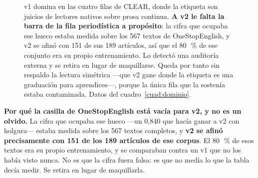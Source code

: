 \documentclass[11pt,a4paper]{article}
\newcommand{\cod}[1]{\texttt{\small #1}}
\newcommand{\pct}{\,\%}
\begin{document}
\begin{figure}[htbp]
\centering
{}
\caption[Matriz modelo $\times$ dominio]{v1 domina en las cuatro filas de CLEAR, donde la
etiqueta son juicios de lectores nativos sobre prosa continua. \textbf{A v2 le falta la
barra de la fila periodística a propósito}: la cifra que ocupaba ese hueco estaba medida
sobre los 567 textos de OneStopEnglish, y v2 se afinó con 151 de sus 189 artículos, así
que el 80~\pct{} de ese conjunto era su propio entrenamiento. Lo detectó una auditoría
externa y se retira en lugar de maquillarse. Queda por tanto sin respaldo la lectura
simétrica —que v2 gane donde la etiqueta es una graduación para aprendices—, porque la
única fila que la sostenía estaba contaminada. Datos del cuadro~\ref{cuad:dominio}.}
\label{fig:dominio}
\end{figure}

\textbf{Por qué la casilla de OneStopEnglish está vacía para v2, y no es un olvido.} La
cifra que ocupaba ese hueco —un 0,840 que hacía ganar a
v2 con holgura— estaba medida sobre los 567 textos completos, y \textbf{v2 se afinó
precisamente con 151 de los 189 artículos de ese corpus}. El 80~\pct{} de esos textos era
su propio entrenamiento, y se comparaban contra un v1 que no los había visto nunca. No es
que la cifra fuera falsa: es que no medía lo que la tabla decía medir. Se retira en lugar
de maquillarla.
\end{document}
